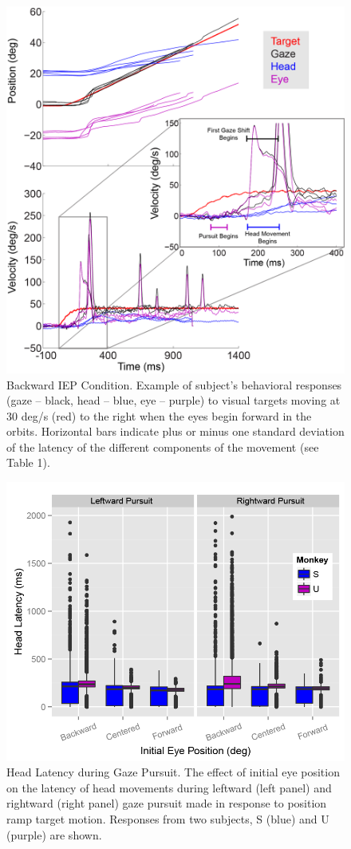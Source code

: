 \documentclass[12pt]{article}
\begin{document}
\begin{figure}[h]
\centering
\includegraphics[width=0.7\linewidth]{./figs/BackwardIEP}
\caption[Behavior with forward IEP]{Backward IEP Condition. Example of subject's behavioral responses (gaze – black, head – blue, eye – purple) to visual targets moving at 30 deg/s (red) to the right when the eyes begin forward in the orbits. Horizontal bars indicate plus or minus one standard deviation of the latency of the different components of the movement (see Table 1).}
\label{fig:BackwardIEP}
\end{figure}

\begin{figure}
\centering
\includegraphics[width=0.7\linewidth]{./figs/RampHeadLatency}
\caption[Head latency during ramp trials]{Head Latency during Gaze Pursuit. The effect of initial eye position on the latency of head movements during leftward (left panel) and rightward (right panel) gaze pursuit made in response to position ramp target motion. Responses from two subjects, S (blue) and U (purple) are shown.}
\label{fig:RampHeadLatency}
\end{figure}
\end{document}
